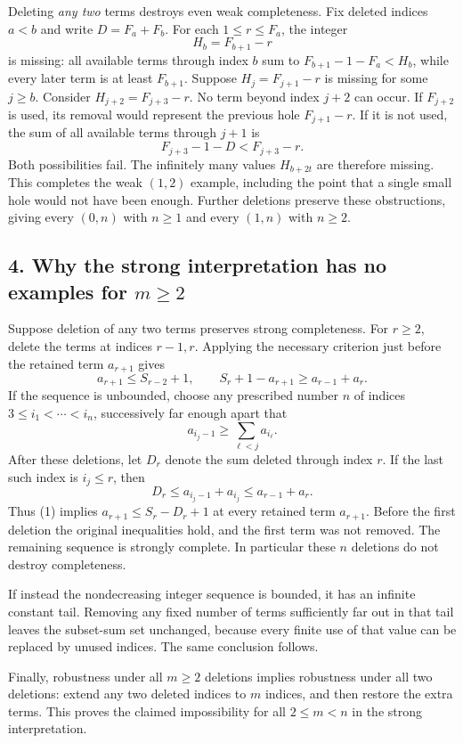 Deleting \emph{any two} terms destroys even weak completeness.
Fix deleted indices $a<b$ and write $D=F_a+F_b$. For each
$1\le r\le F_a$, the integer
\[
 H_b=F_{b+1}-r
\]
is missing: all available terms through index $b$ sum to
$F_{b+1}-1-F_a<H_b$, while every later term is at least $F_{b+1}$.
Suppose $H_j=F_{j+1}-r$ is missing for some $j\ge b$.
Consider $H_{j+2}=F_{j+3}-r$. No term beyond index $j+2$ can occur.
If $F_{j+2}$ is used, its removal would represent the previous hole
$F_{j+1}-r$. If it is not used, the sum of all available terms through
$j+1$ is
\[
 F_{j+3}-1-D<F_{j+3}-r.
\]
Both possibilities fail. The infinitely many values $H_{b+2t}$ are
therefore missing. This completes the weak $(1,2)$ example, including
the point that a single small hole would not have been enough.
Further deletions preserve these obstructions, giving every $(0,n)$
with $n\ge1$ and every $(1,n)$ with $n\ge2$.

\subsection*{4. Why the strong interpretation has no examples for $m\ge2$}
Suppose deletion of any two terms preserves strong completeness.
For $r\ge2$, delete the terms at indices $r-1,r$. Applying the necessary
criterion just before the retained term $a_{r+1}$ gives
\[
 a_{r+1}\le S_{r-2}+1,\qquad
 S_r+1-a_{r+1}\ge a_{r-1}+a_r.                    \tag{1}
\]
If the sequence is unbounded, choose any prescribed number $n$ of
indices $3\le i_1<\cdots<i_n$, successively far enough apart that
\[
 a_{i_j-1}\ge\sum_{\ell<j}a_{i_\ell}.
\]
After these deletions, let $D_r$ denote the sum deleted through index
$r$. If the last such index is $i_j\le r$, then
\[
 D_r\le a_{i_j-1}+a_{i_j}\le a_{r-1}+a_r.
\]
Thus (1) implies $a_{r+1}\le S_r-D_r+1$ at every retained term
$a_{r+1}$. Before the first deletion the original inequalities hold,
and the first term was not removed. The remaining sequence is strongly
complete. In particular these $n$ deletions do not destroy completeness.

If instead the nondecreasing integer sequence is bounded, it has an
infinite constant tail. Removing any fixed number of terms sufficiently
far out in that tail leaves the subset-sum set unchanged, because every
finite use of that value can be replaced by unused indices.
The same conclusion follows.

Finally, robustness under all $m\ge2$ deletions implies robustness under
all two deletions: extend any two deleted indices to $m$ indices, and
then restore the extra terms. This proves the claimed impossibility
for all $2\le m<n$ in the strong interpretation.

